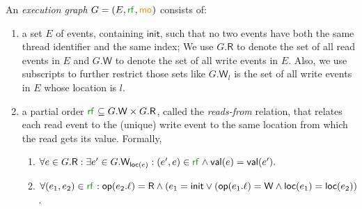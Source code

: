 \documentclass[acmsmall]{acmart}
\def\UM#1{{\textcolor{green!80!black}{\textbf{UM:} #1}}}
\def\MO#1{{\textcolor{orange}{\textbf{MO:} #1}}}
\def\BA#1{{\textcolor{violet}{\textbf{BA: } #1}}}
\renewcommand{\BA}[1]{}
\renewcommand{\UM}[1]{}
\renewcommand{\MO}[1]{}
\newcommand{\trust}{\textsc{Trust}\xspace}
\newcommand{\opw}{\mathsf{W}}
\newcommand{\opr}{\mathsf{R}}
\newcommand{\op}{\mathsf{op}}
\newcommand{\val}{\mathsf{val}}
\newcommand{\loc}{\mathsf{loc}}
\newcommand{\init}{\mathsf{init}}
\newcommand{\rf}[1]{{\textcolor{green!60!black}{\mathsf{rf}}_{#1}}}
\newcommand{\mo}[1]{{\textcolor{orange}{\mathsf{mo}}_{#1}}}
\newcommand{\po}[1]{{\textcolor{darkgray}{\mathsf{po}}_{#1}}}
\newcommand{\inord}{\textcolor{purple}\leq}
\begin{document}
An  \emph{execution graph} $G = (E, \rf{}, \mo{})$ consists of: 
\begin{enumerate}
    \item  a set $E$ of events, containing $\init$, such that no two events have both the same thread identifier and the same index; We use $G.\opr$ to denote the set
    of all read events in $E$ and $G.\opw$ to denote the set of all write events in $E$.
    Also,  we use subscripts to further restrict those sets like $G.\opw_l$ is the set of all write events in $E$ whose location is $l$.
    \item a partial order $\rf{} \subseteq G.\opw \times G.\opr$, called the \emph{reads-from} relation, that relates each read event to the 
    (unique) write event to the same location from which the read gets its value. Formally,
    \begin{enumerate}
        \item $\forall e \in G.\opr : \exists e' \in G.\opw_{\loc(e)} : (e', e) \in \rf{} \wedge \val(e) = \val(e').$ 
        \item $\forall (e_1, e_2) \in \rf{} : \op(e_2.\ell) = \opr \wedge (e_1 = \init \vee (\op(e_1.\ell) = \opw \wedge \loc(e_1) = \loc(e_2))$. 

\end{enumerate}
\end{enumerate}
\end{document}
